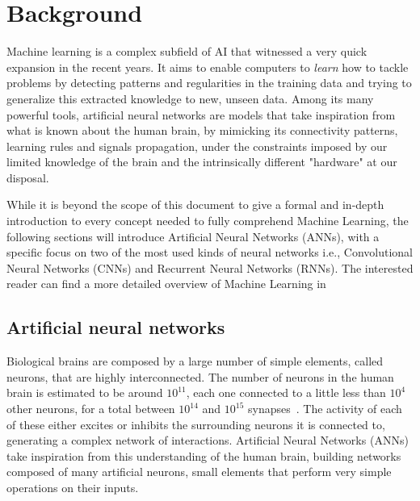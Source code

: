 \chapter{Background}\label{sec:background}

Machine learning is a complex subfield of AI that witnessed a very quick
expansion in the recent years. It aims to enable computers to \emph{learn} how
to tackle problems by detecting patterns and regularities in the training data
and trying to generalize this extracted knowledge to new, unseen data.
Among its many powerful tools, artificial neural networks are models that take
inspiration from what is known about the human brain, by mimicking its
connectivity patterns, learning rules and signals propagation, under the
constraints imposed by our limited knowledge of the brain and the intrinsically
different "hardware" at our disposal.

While it is beyond the scope of this document to give a formal and in-depth
introduction to every concept needed to fully comprehend Machine Learning,
the following sections will introduce Artificial Neural Networks (ANNs), with a
specific focus on two of the most used kinds of neural networks i.e.,
Convolutional Neural Networks (CNNs) and Recurrent Neural Networks (RNNs). The
interested reader can find a more detailed overview of Machine Learning
in~\cite{bishop-book2006,Goodfellow-et-al-2016-Book}

\section{Artificial neural networks}\label{sec:NN}
Biological brains are composed by a large number of simple elements, called
neurons, that are highly interconnected. The number of neurons in the human
brain is estimated to be around $10^{11}$, each one connected to a little less
than $10^{4}$ other neurons, for a total between $10^{14}$ and $10^{15}$
synapses~\cite{drachman2005we}. The activity of each of these either excites or
inhibits the surrounding neurons it is connected to, generating a complex
network of interactions. Artificial Neural Networks (ANNs) take inspiration
from this understanding of the human brain, building networks composed of many
artificial neurons, small elements that perform very simple operations on their
inputs.

